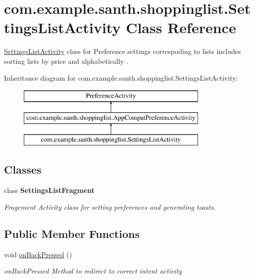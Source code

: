 \hypertarget{classcom_1_1example_1_1santh_1_1shoppinglist_1_1_settings_list_activity}{}\section{com.\+example.\+santh.\+shoppinglist.\+Settings\+List\+Activity Class Reference}
\label{classcom_1_1example_1_1santh_1_1shoppinglist_1_1_settings_list_activity}


\hyperlink{classcom_1_1example_1_1santh_1_1shoppinglist_1_1_settings_list_activity}{Settings\+List\+Activity} class for Preference settings correspoding to lists includes sorting lists by price and alphabetically .  


Inheritance diagram for com.\+example.\+santh.\+shoppinglist.\+Settings\+List\+Activity\+:\begin{figure}[H]
\begin{center}
\leavevmode
\includegraphics[height=3.000000cm]{classcom_1_1example_1_1santh_1_1shoppinglist_1_1_settings_list_activity}
\end{center}
\end{figure}
\subsection*{Classes}
\begin{DoxyCompactItemize}
\item 
class {\bfseries Settings\+List\+Fragment}
\begin{DoxyCompactList}\small\item\em Fragement Activity class for setting preferences and generating toasts. \end{DoxyCompactList}\end{DoxyCompactItemize}
\subsection*{Public Member Functions}
\begin{DoxyCompactItemize}
\item 
void \hyperlink{classcom_1_1example_1_1santh_1_1shoppinglist_1_1_settings_list_activity_a9734ce570d8bd5f31e37e12e5829e220}{on\+Back\+Pressed} ()
\begin{DoxyCompactList}\small\item\em on\+Back\+Pressed Method to redirect to correct intent activity \end{DoxyCompactList}\end{DoxyCompactItemize}
